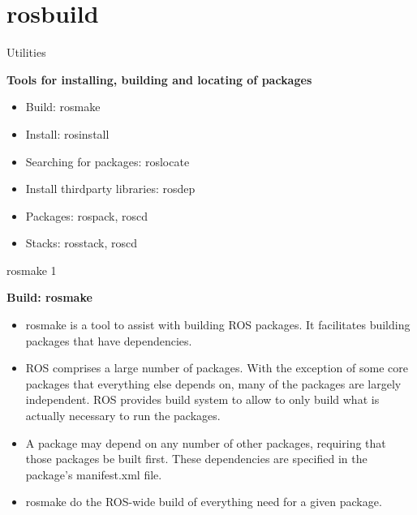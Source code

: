\documentclass{beamer}
\begin{document}
\section{rosbuild\cite{ROS:2015:Online}}
\begin{frame}{Utilities}
\begin{large}\textbf{Tools for installing, building and locating of packages}\end{large}

\begin{itemize}
	\item Build: 							rosmake
	\item Install:							rosinstall
	\item Searching for packages:			roslocate
	\item Install thirdparty libraries:		rosdep
	\item Packages:							rospack, roscd
	\item Stacks:							rosstack, roscd
\end{itemize}
\end{frame}
\begin{frame}{rosmake 1}
	
\begin{large}\textbf{Build: rosmake}\end{large}

\begin{itemize}
\item rosmake is a tool to assist with building ROS packages. It facilitates building packages that have dependencies.
\item ROS comprises a large number of packages. With the exception of some core packages that everything else depends on, many of the packages are largely independent. ROS provides build system to allow to only build what is actually necessary to run the packages.
\item A package may depend on any number of other packages, requiring that those packages be built first. These dependencies are specified in the package's manifest.xml file.
\item rosmake do the ROS-wide build of everything need for a given package.
\end{itemize} 
\end{frame}
\end{document}
